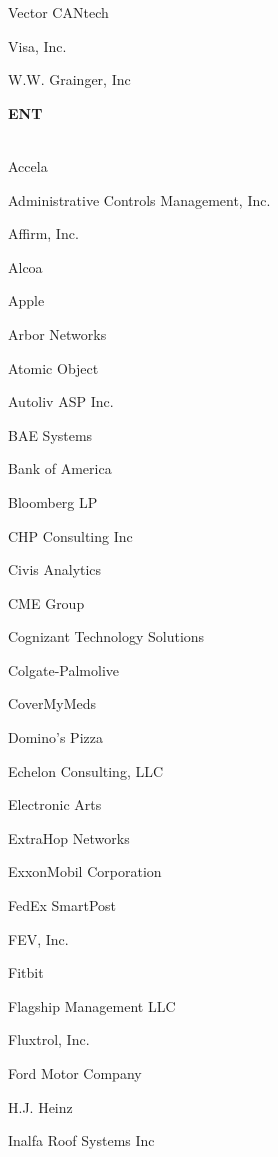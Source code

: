 \documentclass[twoside]{article}
\begin{document}
\begin{center}
\begin{multicols}{5}
\begin{FlushLeft}
\begin{compactitem}
\item Vector CANtech
\item Visa, Inc.
\item W.W. Grainger, Inc
\end{compactitem}
        \end{FlushLeft}
        \vspace{1em}
        {\fontsize{14}{16}\selectfont \bf ENT}\\
        \vspace{-1em}
        ~\hrulefill~
        \vspace{-.9em}
        \begin{FlushLeft}
        \begin{compactitem}
        \item Accela
\item Administrative Controls Management, Inc.
\item Affirm, Inc.
\item Alcoa
\item Apple
\item Arbor Networks
\item Atomic Object
\item Autoliv ASP Inc.
\item BAE Systems
\item Bank of America
\item Bloomberg LP
\item CHP Consulting Inc
\item Civis Analytics
\item CME Group
\item Cognizant Technology Solutions
\item Colgate-Palmolive
\item CoverMyMeds
\item Domino's Pizza
\item Echelon Consulting, LLC
\item Electronic Arts
\item ExtraHop Networks
\item ExxonMobil Corporation
\item FedEx SmartPost
\item FEV, Inc.
\item Fitbit
\item Flagship Management LLC
\item Fluxtrol, Inc.
\item Ford Motor Company
\item H.J. Heinz
\item Inalfa Roof Systems Inc

\end{compactitem}
\end{FlushLeft}
\end{multicols}
\end{center}
\end{document}
